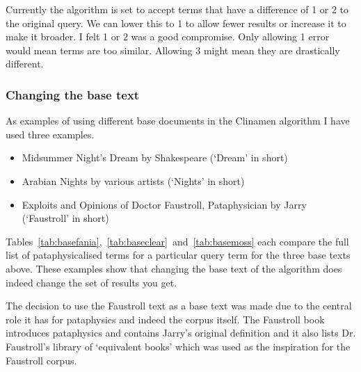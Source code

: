 Currently the algorithm is set to accept terms that have a difference of 1 or 2 to the original query. We can lower this to 1 to allow fewer results or increase it to make it broader. I felt 1 or 2 was a good compromise. Only allowing 1 error would mean terms are too similar. Allowing 3 might mean they are drastically different.


\subsubsection{Changing the base text}
\label{s:basetext}

As examples of using different base documents in the Clinamen algorithm I have used three examples. 

\begin{itemize}
  \item Midsummer Night's Dream by Shakespeare (`Dream' in short)
  \item Arabian Nights by various artists (`Nights' in short)
  \item Exploits and Opinions of Doctor Faustroll, Pataphysician by Jarry (`Faustroll' in short)
\end{itemize}

Tables~\ref{tab:basefania},~\ref{tab:baseclear}~and~\ref{tab:basemoss} each compare the full list of pataphysicalised terms for a particular query term for the three base texts above. These examples show that changing the base text of the algorithm does indeed change the set of results you get. 

The decision to use the Faustroll text as a base text was made due to the central role it has for pataphysics and indeed the corpus itself. The Faustroll book introduces pataphysics and contains Jarry's original definition and it also lists Dr. Faustroll's library of `equivalent books' which was used as the inspiration for the Faustroll corpus.

